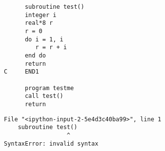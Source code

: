 \documentclass[%
oneside,                 %
final,                   %
10pt]{article}
\begin{document}
\newcommand{\exercisesection}[1]{\subsection*{#1}}


\begin{verbatim}
      subroutine test()
      integer i
      real*8 r
      r = 0
      do i = 1, i
         r = r + i
      end do
      return
C     END1

      program testme
      call test()
      return

\end{verbatim}

\begin{Verbatim}[numbers=none,fontsize=\fontsize{9pt}{9pt},baselinestretch=0.95]
  File "<ipython-input-2-5e4d3c40ba99>", line 1
    subroutine test()
                  ^
SyntaxError: invalid syntax
\end{Verbatim}
\end{document}
